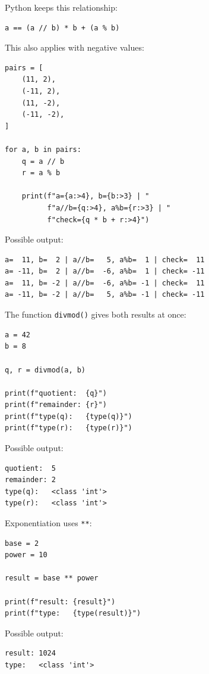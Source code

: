 Python keeps this relationship:

\begin{verbatim}
a == (a // b) * b + (a % b)
\end{verbatim}

This also applies with negative values:

\begin{verbatim}
pairs = [
    (11, 2),
    (-11, 2),
    (11, -2),
    (-11, -2),
]

for a, b in pairs:
    q = a // b
    r = a % b

    print(f"a={a:>4}, b={b:>3} | "
          f"a//b={q:>4}, a%b={r:>3} | "
          f"check={q * b + r:>4}")
\end{verbatim}

Possible output:

\begin{verbatim}
a=  11, b=  2 | a//b=   5, a%b=  1 | check=  11
a= -11, b=  2 | a//b=  -6, a%b=  1 | check= -11
a=  11, b= -2 | a//b=  -6, a%b= -1 | check=  11
a= -11, b= -2 | a//b=   5, a%b= -1 | check= -11
\end{verbatim}

The function \texttt{divmod()} gives both results at once:

\begin{verbatim}
a = 42
b = 8

q, r = divmod(a, b)

print(f"quotient:  {q}")
print(f"remainder: {r}")
print(f"type(q):   {type(q)}")
print(f"type(r):   {type(r)}")
\end{verbatim}

Possible output:

\begin{verbatim}
quotient:  5
remainder: 2
type(q):   <class 'int'>
type(r):   <class 'int'>
\end{verbatim}

Exponentiation uses \texttt{**}:

\begin{verbatim}
base = 2
power = 10

result = base ** power

print(f"result: {result}")
print(f"type:   {type(result)}")
\end{verbatim}

Possible output:

\begin{verbatim}
result: 1024
type:   <class 'int'>
\end{verbatim}


